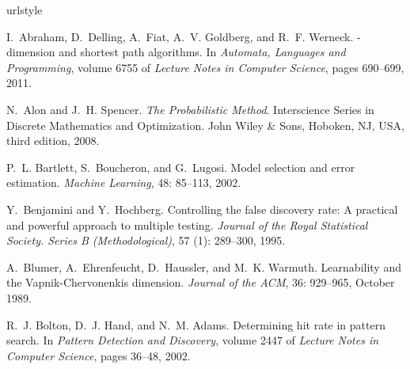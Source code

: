 \begin{thebibliography}{42}
\providecommand{\natexlab}[1]{#1}
\providecommand{\url}[1]{\texttt{#1}}
\expandafter\ifx\csname urlstyle\endcsname\relax
  \providecommand{\doi}[1]{doi: #1}\else
  \providecommand{\doi}{doi: \begingroup \urlstyle{rm}\Url}\fi

I.~Abraham, D.~Delling, A.~Fiat, A.~V. Goldberg, and R.~F. Werneck.
-dimension and shortest path algorithms.
\newblock In \emph{Automata, Languages and Programming}, volume 6755 of
  \emph{Lecture Notes in Computer Science}, pages 690--699, 2011.

N.~Alon and J.~H. Spencer.
\newblock \emph{The Probabilistic Method}.
\newblock Interscience Series in Discrete Mathematics and Optimization. John
  Wiley {\&} Sons, Hoboken, NJ, USA, third edition, 2008.

P.~L. Bartlett, S.~Boucheron, and G.~Lugosi.
\newblock Model selection and error estimation.
\newblock \emph{Machine Learning}, 48: 85--113, 2002.

Y.~Benjamini and Y.~Hochberg.
\newblock Controlling the false discovery rate: A practical and powerful
  approach to multiple testing.
\newblock \emph{Journal of the Royal Statistical Society. Series B
  (Methodological)}, 57 (1): 289--300, 1995.

A.~Blumer, A.~Ehrenfeucht, D.~Haussler, and M.~K. Warmuth.
\newblock Learnability and the {V}apnik-{C}hervonenkis dimension.
\newblock \emph{Journal of the ACM}, 36: 929--965, October 1989.

R.~J. Bolton, D.~J. Hand, and N.~M. Adams.
\newblock Determining hit rate in pattern search.
\newblock In \emph{Pattern Detection and Discovery}, volume 2447 of
  \emph{Lecture Notes in Computer Science}, pages 36--48, 2002.


\end{thebibliography}
